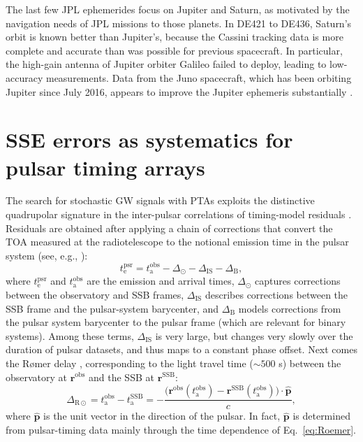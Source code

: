 \documentclass[iop,apj,twocolappendix]{emulateapj}
\begin{document}
The last few JPL ephemerides focus on Jupiter and Saturn, as motivated by the navigation needs of JPL missions to those planets. In DE421 to DE436, Saturn's orbit is known better than Jupiter's, because the Cassini tracking data is more complete and accurate than was possible for previous spacecraft. In particular, the high-gain antenna of Jupiter orbiter Galileo failed to deploy, leading to low-accuracy measurements. Data from the Juno spacecraft, which has been orbiting Jupiter since July 2016, appears to improve the Jupiter ephemeris substantially \citep{2009IPNPR.178C...1F}.

\section{SSE errors as systematics for pulsar timing arrays}
\label{sec:systematics}

The search for stochastic GW signals with PTAs exploits the distinctive quadrupolar signature in the inter-pulsar correlations of timing-model residuals \citep{hd83}.
Residuals are obtained after applying a chain of corrections that convert the TOA measured at the radiotelescope to the notional emission time in the pulsar system (see, e.g., \citealt{ehm06}):
%
\begin{equation}
    t_\mathrm{e}^\mathrm{psr} = t_\mathrm{a}^\mathrm{obs} - \Delta_\odot - \Delta_\mathrm{IS} - \Delta_\mathrm{B},
\end{equation}
%
where $t_\mathrm{e}^\mathrm{psr}$ and $t_\mathrm{a}^\mathrm{obs}$ are the emission and arrival times, $\Delta_\odot$ captures corrections between the observatory and SSB frames, $\Delta_\mathrm{IS}$ describes corrections between the SSB frame and the pulsar-system barycenter, and $\Delta_\mathrm{B}$ models corrections from the pulsar system barycenter to the pulsar frame (which are relevant for binary systems).
Among these terms, $\Delta_\mathrm{IS}$ is very large, but changes very slowly over the duration of pulsar datasets, and thus maps to a constant phase offset. Next comes the R{\o}mer delay \citep{Roemer1676}, corresponding to the light travel time ($\sim 500$ s) between the observatory at $\mathbf{r}^\mathrm{obs}$ and the SSB at $\mathbf{r}^\mathrm{SSB}$:
%
\begin{equation}
\label{eq:Roemer}
\Delta_{\mathrm{R}\odot} =
t_\mathrm{a}^\mathrm{obs} - t_\mathrm{a}^\mathrm{SSB} =
-\frac{\bigl(\mathbf{r}^\mathrm{obs}(t_\mathrm{a}^\mathrm{obs}) - \mathbf{r}^\mathrm{SSB}(t_\mathrm{a}^\mathrm{obs})\bigr) \cdot \hat{\mathbf{p}}}{c},
\end{equation}
%
where $\hat{\mathbf{p}}$ is the unit vector in the direction of the pulsar. In fact, $\hat{\mathbf{p}}$ is determined from pulsar-timing data mainly through the time dependence of Eq.\ \eqref{eq:Roemer}. 
\end{document}
